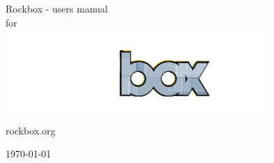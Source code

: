 \thispagestyle{empty}
\vspace*{0.3cm}
\begin{center}
\Huge{Rockbox - users manual\\for\\\playername}\vspace{0.7cm}
\includegraphics[width=10cm]{frontpage/rockbox3540.png}
\vspace{1cm}

\large rockbox.org

\today
\end{center}

\pagebreak
\thispagestyle{empty}
\cleardoublepage
